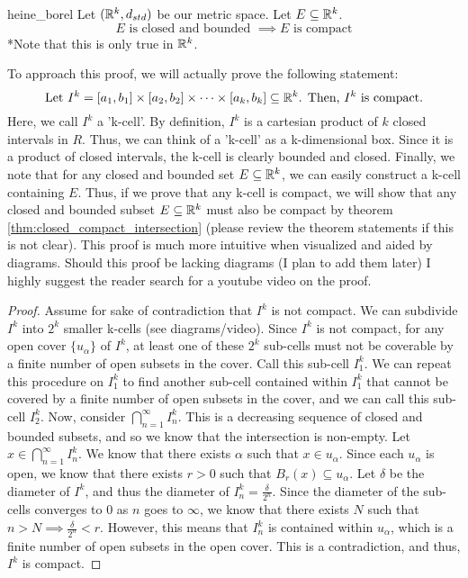 \begin{thm}{}{heine_borel}
Let \(({\mathbb R}^k, d_{std})\) be our metric space. Let \(E \subseteq {\mathbb R}^k\). \newline 
\begin{equation*}
  \textrm{\(E\) is closed and bounded \(\implies E\) is compact}
\end{equation*}
*Note that this is only true in \({\mathbb R}^k\).\newline 

To approach this proof, we will actually prove the following statement: \newline 
\begin{equation*}
  \textrm{Let \(I^k = [a_1,b_1] \times [a_2,b_2] \times\cdots\times [a_k, b_k] \subseteq {\mathbb R}^k\). Then, \(I^k\) is compact.} 
\end{equation*}
Here, we call \(I^k\) a 'k-cell'. By definition, \(I^k\) is a cartesian product of \(k\) closed intervals in \(R\). Thus, we can think of a 'k-cell' as a k-dimensional box. Since it is a product of closed intervals, the k-cell is clearly bounded and closed. Finally, we note that for any closed and bounded set \(E \subseteq {\mathbb R}^k\), we can easily construct a k-cell containing \(E\). Thus, if we prove that any k-cell is compact, we will show that any closed and bounded subset \(E \subseteq {\mathbb R}^k\) must also be compact by theorem \ref{thm:closed_compact_intersection} (please review the theorem statements if this is not clear). This proof is much more intuitive when visualized and aided by diagrams. Should this proof be lacking diagrams (I plan to add them later) I highly suggest the reader search for a youtube video on the proof.
\begin{proof}
Assume for sake of contradiction that \(I^k\) is not compact. We can subdivide \(I^k\) into \(2^k\) smaller k-cells (see diagrams/video). Since \(I^k\) is not compact, for any open cover \(\{u_\alpha\}\) of \(I^k\), at least one of these \(2^k\) sub-cells must not be coverable by a finite number of open subsets in the cover. Call this sub-cell \(I^k_1\). We can repeat this procedure on \(I^k_1\) to find another sub-cell contained within \(I^k_1\) that cannot be covered by a finite number of open subsets in the cover, and we can call this sub-cell \(I^k_2\). Now, consider \(\bigcap_{n=1}^{\infty}I^k_n\). This is a decreasing sequence of closed and bounded subsets, and so we know that the intersection is non-empty. Let \(x \in \bigcap_{n=1}^{\infty}I^k_n\). We know that there exists \(\alpha\) such that \(x \in u_\alpha\). Since each \(u_\alpha\) is open, we know that there exists \(r > 0\) such that \(B_r(x) \subseteq u_\alpha\). Let \(\delta\) be the diameter of \(I^k\), and thus the diameter of \(I^k_n = \frac{\delta}{2^n}\). Since the diameter of the sub-cells converges to 0 as \(n\) goes to \(\infty\), we know that there exists \(N\) such that \(n > N \implies \frac{\delta}{2^n} < r\). However, this means that \(I^k_n\) is contained within \(u_\alpha\), which is a finite number of open subsets in the open cover. This is a contradiction, and thus, \(I^k\) is compact. 
\end{proof}


\end{thm}

